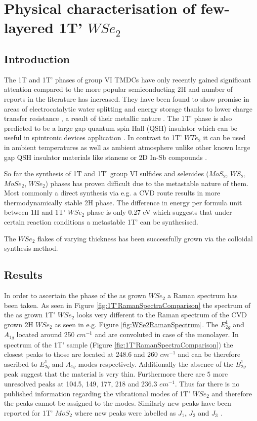 \chapter{Physical characterisation of few-layered 1T' $WSe_2$}

\section{Introduction}

The 1T and 1T' phases of group VI TMDCs have only recently gained significant attention compared to the more popular semiconducting 2H and number of reports in the literature has increased. They have been found to show promise in areas of electrocatalytic water splitting and energy storage thanks to lower charge transfer resistance \cite{Voiry2013}, a result of their metallic nature \cite{Wypych1992}. The 1T' phase is also predicted to be a large gap quantum spin Hall (QSH) insulator which can be useful in spintronic devices  application \cite{Chen2018}. In contrast to 1T' $WTe_2$ \cite{Fei2017} it can be used in ambient temperatures as well as ambient atmosphere unlike other known large gap QSH insulator materials like stanene \cite{Xu2013} or 2D In-Sb compounds \cite{Gruznev2018}. 

So far the synthesis of 1T and 1T' group VI sulfides and selenides ($MoS_2$, $WS_2$, $MoSe_2$, $WSe_2$)  phases has proven difficult due to the metastable nature of them. Most commonly a direct synthesis via e.g. a CVD route results in more thermodynamically stable 2H phase. The difference in energy per formula unit between 1H and 1T' $WSe_2$ phase is only 0.27 eV which suggests that under certain reaction conditions a metastable 1T' can be synthesised.

The $WSe_2$ flakes of varying thickness has been successfully grown via the colloidal synthesis method.

\section{Results}

In order to ascertain the phase of the as grown $WSe_2$ a Raman spectrum has been taken. As seen in Figure \ref{fig:1T'RamanSpectraComparison} the spectrum of the as grown 1T' $WSe_2$ looks very different to the Raman spectrum of the CVD grown 2H $WSe_2$ as seen in e.g. Figure \ref{fig:WSe2RamanSpectrum}. The $E^1_{2g}$ and $A_{1g}$ located around 250 $cm^{-1}$ and are convoluted in case of the monolayer. In spectrum of the 1T' sample (Figure \ref{fig:1T'RamanSpectraComparison}) the closest peaks to those are located at 248.6 and 260 $cm^{-1}$ and can be therefore ascribed to $E^1_{2g}$ and $A_{1g}$ modes respectively. Additionally the absence of the $B^1_{2g}$ peak suggest that the material is very thin. Furthermore there are 5 more unresolved peaks at 104.5, 149, 177, 218 and 236.3 $cm^{-1}$. Thus far there is no published information regarding the vibrational modes of 1T' $WSe_2$ and therefore the peaks cannot be assigned to the modes. Similarly new peaks have been reported for 1T' $MoS_2$ where new peaks were labelled as $J_1$, $J_2$ and $J_3$ \cite{Yu2018}.


